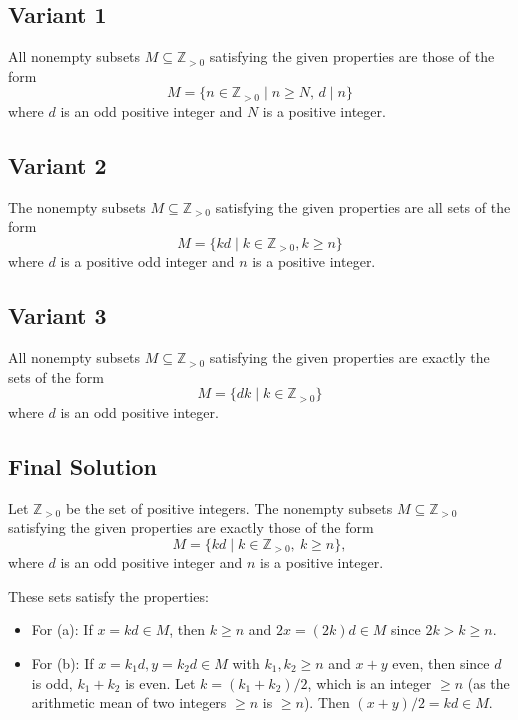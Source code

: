 \documentclass[12pt,a4paper]{article}
\theoremstyle{definition}
\begin{document}
\subsection{Variant 1}
    All nonempty subsets $M \subseteq \mathbb{Z}_{>0}$ satisfying the given properties are those of the form
    \[
        M = \{ n \in \mathbb{Z}_{>0} \mid n \geq N,\, d \mid n \}
    \]
    where $d$ is an odd positive integer and $N$ is a positive integer.

\subsection{Variant 2}
    The nonempty subsets $M \subseteq \mathbb{Z}_{>0}$ satisfying the given properties are all sets of the form
    \[
        M = \{ k d \mid k \in \mathbb{Z}_{>0}, k \geq n \}
    \]
    where $d$ is a positive odd integer and $n$ is a positive integer.

\subsection{Variant 3}
    All nonempty subsets $M \subseteq \mathbb{Z}_{>0}$ satisfying the given properties are exactly the sets of the form
    \[
        M = \{ d k \mid k \in \mathbb{Z}_{>0} \}
    \]
    where $d$ is an odd positive integer.

\subsection{Final Solution}
    Let $\mathbb{Z}_{>0}$ be the set of positive integers. The nonempty subsets $M \subseteq \mathbb{Z}_{>0}$ satisfying the given properties are exactly those of the form
    \[
        M = \{ k d \mid k \in \mathbb{Z}_{>0},\ k \geq n \},
    \]
    where $d$ is an odd positive integer and $n$ is a positive integer.

    These sets satisfy the properties:

    \begin{itemize}
        \item For (a): If $x = k d \in M$, then $k \geq n$ and $2x = (2k) d \in M$ since $2k > k \geq n$.

        \item For (b): If $x = k_1 d, y = k_2 d \in M$ with $k_1, k_2 \geq n$ and $x + y$ even, then since $d$ is odd, $k_1 + k_2$ is even. Let $k = (k_1 + k_2)/2$, which is an integer $\geq n$ (as the arithmetic mean of two integers $\geq n$ is $\geq n$). Then $(x + y)/2 = k d \in M$.
    \end{itemize}
\end{document}
